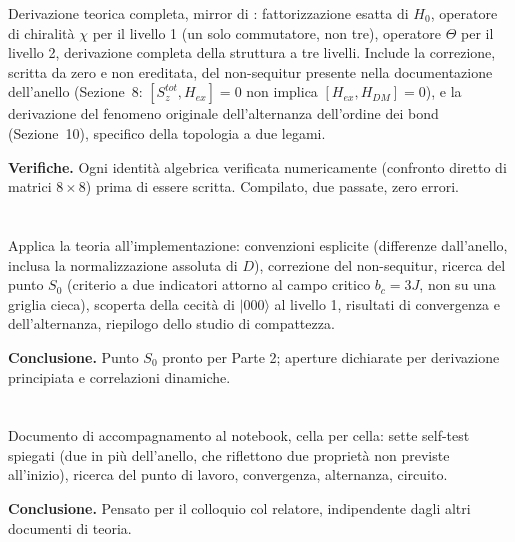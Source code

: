 \documentclass[11pt,a4paper]{article}
\newcommand{\ket}[1]{\lvert #1 \rangle}
\begin{document}
Derivazione teorica completa, mirror di
\texttt{}: fattorizzazione
esatta di $H_0$, operatore di chiralità $\chi$ per il livello 1 (un solo
commutatore, non tre), operatore $\Theta$ per il livello 2, derivazione
completa della struttura a tre livelli. Include la correzione, scritta da
zero e non ereditata, del non-sequitur presente nella documentazione
dell'anello (Sezione~8: $[S_z^{tot},H_{ex}]=0$ non implica
$[H_{ex},H_{DM}]=0$), e la derivazione del fenomeno originale
dell'alternanza dell'ordine dei bond (Sezione~10), specifico della
topologia a due legami.

\textbf{Verifiche.} Ogni identità algebrica verificata numericamente
(confronto diretto di matrici $8\times8$) prima di essere scritta.
Compilato, due passate, zero errori.

\section*{\texttt{}}

Applica la teoria all'implementazione: convenzioni esplicite (differenze
dall'anello, inclusa la normalizzazione assoluta di $D$), correzione del
non-sequitur, ricerca del punto $S_0$ (criterio a due indicatori attorno
al campo critico $b_c=3J$, non su una griglia cieca), scoperta della
cecità di $\ket{000}$ al livello 1, risultati di convergenza e
dell'alternanza, riepilogo dello studio di compattezza.

\textbf{Conclusione.} Punto $S_0$ pronto per Parte 2; aperture dichiarate
per derivazione principiata e correlazioni dinamiche.

\section*{\texttt{}}

Documento di accompagnamento al notebook, cella per cella: sette
self-test spiegati (due in più dell'anello, che riflettono due proprietà
non previste all'inizio), ricerca del punto di lavoro, convergenza,
alternanza, circuito.

\textbf{Conclusione.} Pensato per il colloquio col relatore, indipendente
dagli altri documenti di teoria.

\section*{\texttt{}}
\end{document}
